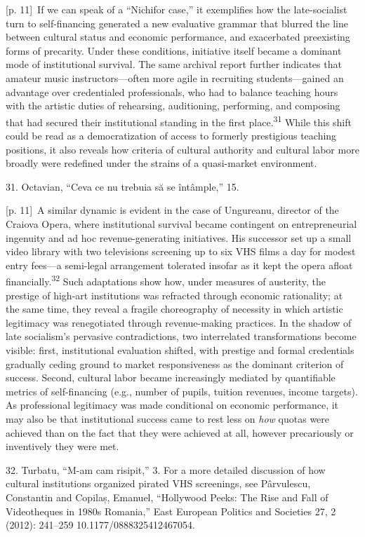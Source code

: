 \documentclass[10pt,a4paper]{article}
\begin{document}
{\scriptsize\color{gray} [p. 11]}\ If we can speak of a “Nichifor case,” it exemplifies how the late-socialist turn to self-financing generated a new evaluative grammar that blurred the line between cultural status and economic performance, and exacerbated preexisting forms of precarity. Under these conditions, initiative itself became a dominant mode of institutional survival. The same archival report further indicates that amateur music instructors—often more agile in recruiting students—gained an advantage over credentialed professionals, who had to balance teaching hours with the artistic duties of rehearsing, auditioning, performing, and composing that had secured their institutional standing in the first place.\nobreak\textsuperscript{31} While this shift could be read as a democratization of access to formerly prestigious teaching positions, it also reveals how criteria of cultural authority and cultural labor more broadly were redefined under the strains of a quasi-market environment.\par{\small 31. Octavian, “Ceva ce nu trebuia să se întâmple,” 15.\par}
{\scriptsize\color{gray} [p. 11]}\ A similar dynamic is evident in the case of Ungureanu, director of the Craiova Opera, where institutional survival became contingent on entrepreneurial ingenuity and ad hoc revenue-generating initiatives. His successor set up a small video library with two televisions screening up to six VHS films a day for modest entry fees—a semi-legal arrangement tolerated insofar as it kept the opera afloat financially.\nobreak\textsuperscript{32} Such adaptations show how, under measures of austerity, the prestige of high-art institutions was refracted through economic rationality; at the same time, they reveal a fragile choreography of necessity in which artistic legitimacy was renegotiated through revenue-making practices. In the shadow of late socialism’s pervasive contradictions, two interrelated transformations become visible: first, institutional evaluation shifted, with prestige and formal credentials gradually ceding ground to market responsiveness as the dominant criterion of success. Second, cultural labor became increasingly mediated by quantifiable metrics of self-financing (e.g., number of pupils, tuition revenues, income targets). As professional legitimacy was made conditional on economic performance, it may also be that institutional success came to rest less on \textit{how} quotas were achieved than on the fact that they were achieved at all, however precariously or inventively they were met.\par{\small 32. Turbatu, “M-am cam risipit,” 3. For a more detailed discussion of how cultural institutions organized pirated VHS screenings, see Pârvulescu, Constantin and Copilaș, Emanuel, “Hollywood Peeks: The Rise and Fall of Videotheques in 1980s Romania,” East European Politics and Societies 27, 2 (2012): 241–259 10.1177/0888325412467054.\par}
\end{document}
